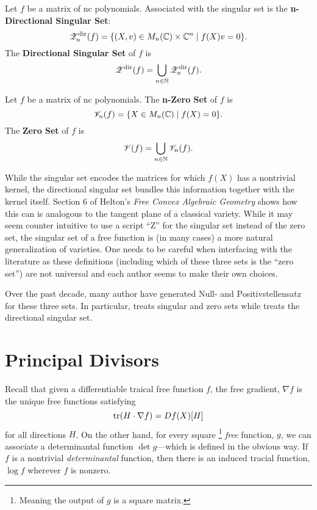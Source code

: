 \begin{definition}%
  Let \(f\) be a matrix of nc polynomials. Associated with the singular set is
  the \textbf{n-Directional Singular Set}:
  \[
    \mathscr{Z}^{\textrm{dir}}_n(f) = \{(X,v) \in M_n(\mathbb{C}) \times \mathbb{C} ^n \mid f(X)v = 0\}.
  \]
  The \textbf{Directional Singular Set} of \(f\) is
  \[
    \mathscr{Z}^{\textrm{dir}}(f) = \bigcup_{n \in \mathbb{N} } \mathscr{Z}^{\textrm{dir}}_n(f).
  \]
\end{definition}

\begin{definition}%
\label{def:zeroset}
  Let \(f\) be a matrix of nc polynomials. The \textbf{n-Zero Set} of \(f\) is
  \[
    \mathscr{V}_n(f) = \{X \in M_n (\mathbb{C}) \mid f(X) =0\}.
  \]
  The \textbf{Zero Set} of \(f\) is
  \[
    \mathscr{V}(f) = \bigcup_{n \in \mathbb{N} } \mathscr{V}_n(f).
  \]
\end{definition}

While the singular set encodes the matrices for which \(f(X)\) has a nontrivial
kernel, the directional singular set bundles this information together with the
kernel itself. Section 6 of Helton's \emph{Free Convex Algebraic Geometry}
\cite{heltonFree2013} shows how this can is analogous to the tangent plane of a
classical variety. While it may seem counter intuitive to use a script ``Z''
for the singular set instead of the zero set, the singular set of a free
function is (in many cases) a more natural generalization of varieties.
One needs to be careful when interfacing with the literature as these
definitions (including which of these three sets is the ``zero set'') are not
universal and each author seems to make their own choices.

Over the past decade, many author have generated Null- and
Positivstellensatz for these three sets. In particular,
\cite{heltonFactorization2019} treats singular and zero sets while
\cite{heltonStrong2007} treats the directional singular set.

\section{Principal Divisors}%
\label{sec:prindiv}

Recall that given a differentiable traical free function \(f\), the free
gradient, \(\nabla f\) is the unique free functions satisfying
\[
  \operatorname{tr} (H \cdot \nabla f) = Df(X)[H]
\]
for all directions \(H\). On the other hand, for every square
\footnote{Meaning the output of \(g\) is a square matrix.}
\emph{free} function, \(g\), we can associate a determinantal function
\(\det g\)---which is defined in the obvious way. If \(f\) is a nontrivial
\emph{determinantal} function, then there is an induced tracial function,
\(\log f\) wherever \(f\) is nonzero.



